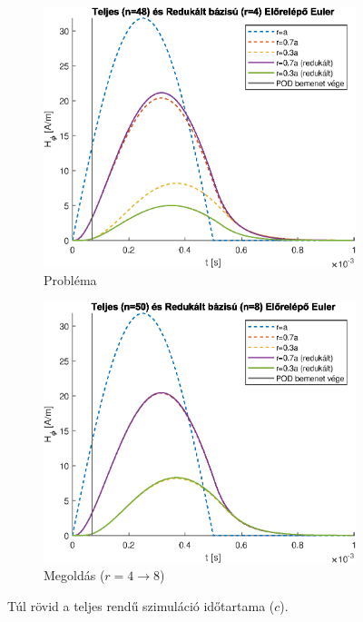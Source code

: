         \begin{figure}[h]
            \centering
            \begin{subfigure}{0.48\textwidth}
                \includegraphics[width=\textwidth]{kep/euler_0.07_4_td.eps}
                \caption{Probléma}
                \label{subfig:keves_ido_rossz}
            \end{subfigure}
            \begin{subfigure}{0.48\textwidth}
                \includegraphics[width=\textwidth]{kep/euler_0.07_8_td.eps}
                \caption{Megoldás ($r=4 \rightarrow 8$)}
                \label{subfig:keves_ido_jo}
            \end{subfigure}
            \caption{Túl rövid a teljes rendű szimuláció időtartama ($c$).}
            \label{fig:keves_ido}
        \end{figure}
